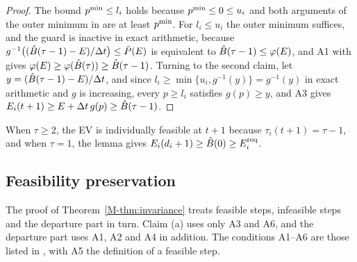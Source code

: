 \begin{proof}
The bound $p^{\min}\le l_i$ holds because $p^{\min}\le0\le u_i$ and both arguments of the outer minimum in  are at least $p^{\min}$.
For $l_i\le u_i$ the outer minimum suffices, and the guard is inactive in exact arithmetic, because $g^{-1}\big((\hat B(\tau-1)-E)/\Delta t\big)\le\bar P(E)$ is equivalent to $\hat B(\tau-1)\le\varphi(E)$, and A1 with  gives $\varphi(E)\ge\varphi(\hat B(\tau))\ge\hat B(\tau-1)$.
Turning to the second claim, let $y=(\hat B(\tau-1)-E)/\Delta t$, and since $l_i\ge\min\{u_i,g^{-1}(y)\}=g^{-1}(y)$ in exact arithmetic and $g$ is increasing, every $p\ge l_i$ satisfies $g(p)\ge y$, and A3 gives $E_i(t+1)\ge E+\Delta t\,g(p)\ge\hat B(\tau-1)$.
\end{proof}

When $\tau\ge2$, the EV is individually feasible at $t+1$ because $\tau_i(t+1)=\tau-1$, and when $\tau=1$, the lemma gives $E_i(d_i+1)\ge\hat B(0)\ge E^{\mathrm{req}}_i$.

\subsection{Feasibility preservation}\label{app:theorem}

The proof of Theorem~\ref{M-thm:invariance} treats feasible steps, infeasible steps and the departure part in turn.
Claim (a) uses only A3 and A6, and the departure part uses A1, A2 and A4 in addition.
The conditions A1--A6 are those listed in , with A5 the definition of a feasible step.

